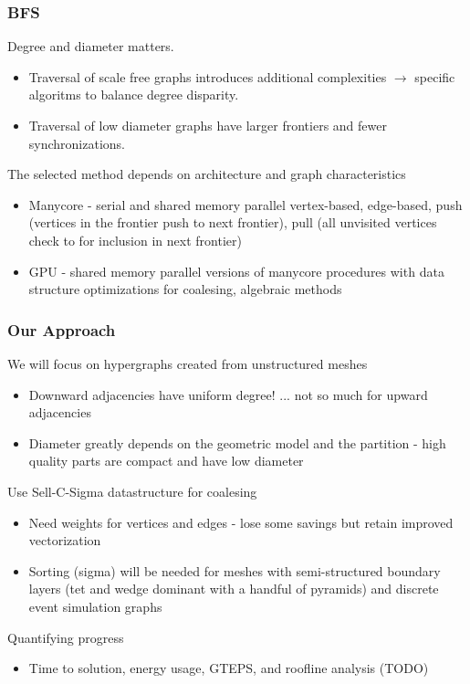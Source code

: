 \documentclass{beamer}
\begin{document}
\begin{frame}
  \frametitle{BFS}
  Degree and diameter matters.
  \begin{itemize}
    \item Traversal of scale free graphs introduces additional
      complexities $\rightarrow$ specific algoritms to balance degree disparity.
    \item Traversal of low diameter graphs have larger frontiers and fewer
      synchronizations.
  \end{itemize}
  The selected method depends on architecture and graph characteristics
  \begin{itemize}
    \item Manycore - serial and shared memory parallel vertex-based, edge-based, push (vertices
      in the frontier push to next frontier), pull (all unvisited vertices check
      to for inclusion in next frontier)
    \item GPU - shared memory parallel versions of manycore procedures with data structure
      optimizations for coalesing, algebraic methods
  \end{itemize}
\end{frame}

\begin{frame}
  \frametitle{Our Approach}
  We will focus on hypergraphs created from unstructured meshes
  \begin{itemize}
    \item Downward adjacencies have uniform degree! ... not so much for upward
      adjacencies
    \item Diameter greatly depends on the geometric model and the
      partition - high quality parts are compact and have low diameter
  \end{itemize}
  Use Sell-C-Sigma datastructure for coalesing 
  \begin{itemize}
    \item Need weights for vertices and edges - lose some savings but retain
      improved vectorization
    \item Sorting (sigma) will be needed for meshes with semi-structured boundary layers (tet
      and wedge dominant with a handful of pyramids) and discrete event simulation graphs
  \end{itemize}
  Quantifying progress
  \begin{itemize}
    \item Time to solution, energy usage, GTEPS, and roofline analysis (TODO)
  \end{itemize}
\end{frame}
\end{document}
